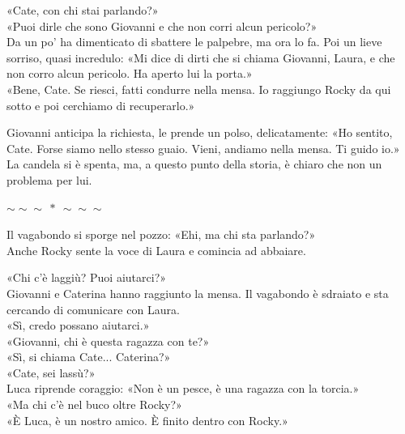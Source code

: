 \documentclass[10pt,oneside]{extbook}
\newcommand{\separatore}{\par
  \begin{center}
    {\Large $\sim\!\!\sim\!\!\sim\ \ast\ \sim\!\!\sim\!\!\sim$}
  \end{center}
  \par
}
\begin{document}
\par\medskip
«Cate, con chi stai parlando?»\\
«Puoi dirle che sono Giovanni e che non corri alcun pericolo?»\\
Da un po' ha dimenticato di sbattere le palpebre, ma ora lo fa. Poi un lieve sorriso, quasi incredulo:
«Mi dice di dirti che si chiama Giovanni, Laura, e che non corro alcun pericolo. Ha aperto lui la porta.»\\
«Bene, Cate. Se riesci, fatti condurre nella mensa. Io raggiungo Rocky da qui sotto e poi cerchiamo di recuperarlo.»

\par\medskip
Giovanni anticipa la richiesta, le prende un polso, delicatamente:
«Ho sentito, Cate. Forse siamo nello stesso guaio. Vieni, andiamo nella mensa. Ti guido io.»\\
La candela si \`e spenta, ma,  a questo punto della storia,  \`e chiaro che non un problema per lui.

\separatore

\par\medskip
Il vagabondo si sporge nel pozzo: «Ehi, ma chi sta parlando?»\\
Anche Rocky sente la voce di Laura e comincia ad abbaiare.

\par\medskip
«Chi c’\`e laggiù? Puoi aiutarci?»\\
Giovanni e Caterina hanno raggiunto la mensa. Il vagabondo \`e sdraiato e sta cercando di comunicare con Laura.\\
«Sì, credo possano aiutarci.»\\
«Giovanni, chi \`e questa ragazza con te?»\\
«Sì, si chiama Cate...  Caterina?»\\
«Cate, sei lassù?»\\
Luca riprende coraggio:
«Non \`e un pesce, \`e una ragazza con la torcia.»\\
«Ma chi c’\`e nel buco oltre Rocky?»\\
«\`E Luca, \`e un nostro amico. \`E finito dentro con Rocky.»
\end{document}
